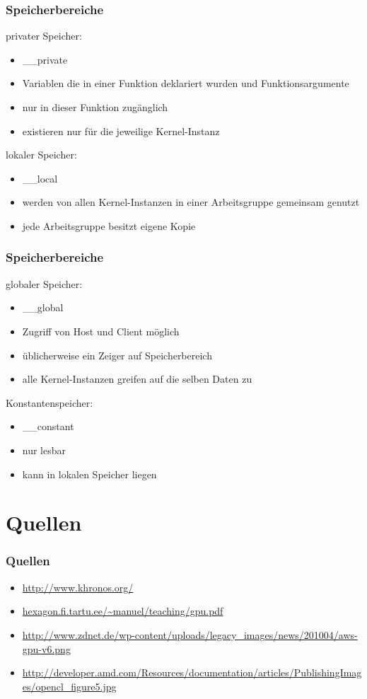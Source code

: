 \documentclass{beamer}
\begin{document}
\begin{frame}[fragile]
\frametitle{Speicherbereiche}
privater Speicher:
\begin{itemize}
\item \_\_private
\item Variablen die in einer Funktion deklariert wurden und Funktionsargumente
\item nur in dieser Funktion zugänglich
\item existieren nur für die jeweilige Kernel-Instanz
\end{itemize}
lokaler Speicher:
\begin{itemize}
\item \_\_local
\item werden von allen Kernel-Instanzen in einer Arbeitsgruppe gemeinsam genutzt
\item jede Arbeitsgruppe besitzt eigene Kopie 
\end{itemize}
\end{frame}

\begin{frame}[fragile]
\frametitle{Speicherbereiche}
globaler Speicher:
\begin{itemize}
\item \_\_global
\item Zugriff von Host und Client möglich
\item üblicherweise ein Zeiger auf Speicherbereich
\item alle Kernel-Instanzen greifen auf die selben Daten zu
\end{itemize}
Konstantenspeicher:
\begin{itemize}
\item \_\_constant
\item nur lesbar
\item kann in lokalen Speicher liegen
\end{itemize}
\end{frame}

\section{Quellen}
\begin{frame}[fragile]
\frametitle{Quellen}
\begin{itemize}
\item \url{http://www.khronos.org/}
\item \url{hexagon.fi.tartu.ee/~manuel/teaching/gpu.pdf}
\item \url{http://www.zdnet.de/wp-content/uploads/legacy_images/news/201004/aws-gpu-v6.png}
\item \url{http://developer.amd.com/Resources/documentation/articles/PublishingImages/opencl_figure5.jpg}
\end{itemize}
\end{frame}
\end{document}

